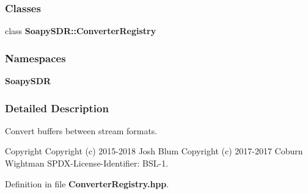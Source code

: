\subsubsection*{Classes}
\begin{DoxyCompactItemize}
\item 
class {\bf Soapy\+S\+D\+R\+::\+Converter\+Registry}
\end{DoxyCompactItemize}
\subsubsection*{Namespaces}
\begin{DoxyCompactItemize}
\item 
 {\bf Soapy\+S\+DR}
\end{DoxyCompactItemize}


\subsubsection{Detailed Description}
Convert buffers between stream formats. 

\begin{DoxyCopyright}{Copyright}
Copyright (c) 2015-\/2018 Josh Blum Copyright (c) 2017-\/2017 Coburn Wightman S\+P\+D\+X-\/\+License-\/\+Identifier\+: B\+S\+L-\/1. 
\end{DoxyCopyright}


Definition in file {\bf Converter\+Registry.\+hpp}.

